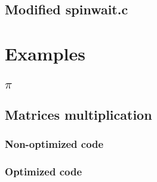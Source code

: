 \section{Modified spinwait.c}
  


\chapter{Examples}

\section{$\pi$}


\label{pi}

\section{Matrices multiplication}

\subsection{Non-optimized code}
\label{matmul}


\subsection{Optimized code}
\label{matmulot}


